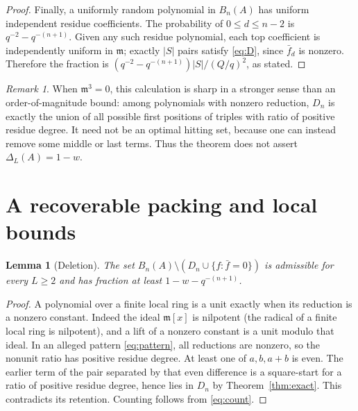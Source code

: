 \documentclass[11pt]{article}
\newtheorem{lemma}[theorem]{Lemma}
\theoremstyle{remark}\newtheorem{remark}[theorem]{Remark}
\newcommand{\m}{\mathfrak m}
\begin{document}
\begin{proof}
Finally, a uniformly random polynomial in $B_n(A)$ has uniform independent residue coefficients. The probability of $0\le d\le n-2$ is $q^{-2}-q^{-(n+1)}$. Given any such residue polynomial, each top coefficient is independently uniform in $\m$; exactly $|S|$ pairs satisfy \eqref{eq:D}, since $\bar f_d$ is nonzero. Therefore the fraction is $(q^{-2}-q^{-(n+1)})|S|/(Q/q)^2$, as stated.
\end{proof}

\begin{remark}
When $\m^3=0$, this calculation is sharp in a stronger sense than an order-of-magnitude bound: among polynomials with nonzero reduction, $D_n$ is exactly the union of all possible first positions of triples with ratio of positive residue degree. It need not be an optimal hitting set, because one can instead remove some middle or last terms. Thus the theorem does not assert $\Delta_L(A)=1-w$.
\end{remark}

\section{A recoverable packing and local bounds}
\begin{lemma}[Deletion]\label{lem:deletion}
The set $B_n(A)\setminus(D_n\cup\{f:\bar f=0\})$ is admissible for every $L\ge2$ and has fraction at least $1-w-q^{-(n+1)}$.
\end{lemma}
\begin{proof}
A polynomial over a finite local ring is a unit exactly when its reduction is a nonzero constant. Indeed the ideal $\m[x]$ is nilpotent (the radical of a finite local ring is nilpotent), and a lift of a nonzero constant is a unit modulo that ideal. In an alleged pattern \eqref{eq:pattern}, all reductions are nonzero, so the nonunit ratio has positive residue degree. At least one of $a,b,a+b$ is even. The earlier term of the pair separated by that even difference is a square-start for a ratio of positive residue degree, hence lies in $D_n$ by Theorem~\ref{thm:exact}. This contradicts its retention. Counting follows from \eqref{eq:count}.
\end{proof}
\end{document}
